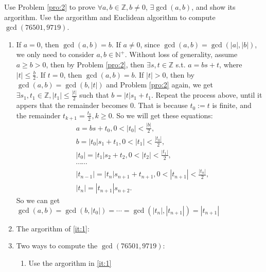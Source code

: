 \documentclass{ctexart}
\begin{document}
\begin{problem}
  Use Problem \ref{pro:2} to prove \(\forall a,b \in \mathbb{Z}, b \neq 0\), \(\exists \gcd(a,b)\), and show its argorithm.
  Use the argorithm and Euclidean algorithm to compute \(\gcd(76501,9719)\).
\end{problem}
\begin{solution}
  \begin{enumerate}
    \item \label{it:1} If \(a =0\), then \(\gcd(a,b) = b\).
      If \(a \neq 0\), since \(\gcd(a,b) = \gcd(|a|,|b|)\), we only need to consider \(a,b \in \mathbb{N}^+\).
      Without loss of generality, assume \(a \geq b > 0\), then by
      Problem \ref{pro:2}, then \(\exists s, t \in \mathbb{Z}\) s.t. \(a = bs + t\), where \(|t| \leq \frac{b}{2}\).
      If \(t=0\), then \(\gcd(a,b) =b\). If \(|t| >0\), then by \(\gcd(a,b) = \gcd(b,|t|)\) and Problem \ref{pro:2} again, we get \(\exists s_1,t_1 \in \mathbb{Z}, |t_1| \leq \frac{|t|}{2}\) such that
      \(b = |t|s_1 + t_1\). Repeat the process above, until it appers that the remainder becomes \(0\).
      That is because \(t_0:=t\) is finite, and the remainder \( t_{k + 1} = \frac{t_k}{2}, k \geq 0\).
      So we will get these equations:
      \begin{equation}
        \begin{aligned}
           & a = bs + t_0, 0 < |t_0| < \frac{|b|}{2},                           \\
           & b = |t_0|s_1 + t_1, 0 < |t_1| < \frac{|t_0|}{2},                   \\
           & |t_0| = |t_1|s_2 + t_2, 0 < |t_2| < \frac{|t_1|}{2},               \\
           & \cdots\cdots                                                       \\
           & |t_{n-1}| = |t_{n}|s_{n+1}+t_{n+1}, 0< |t_{n+1}| <\frac{|t_n|}{2}, \\
           & |t_{n}| = |t_{n+1}|s_{n+2}.
        \end{aligned}
      \end{equation}
      So we can get \(\gcd(a,b)=\gcd(b,|t_0|)=\cdots=\gcd(|t_n|,|t_{n+1}|)=|t_{n+1}|\)
    \item The argorithm of \ref{it:1}:
      
    \item Two ways to compute the \(\gcd(76501,9719)\):\\
      \begin{enumerate}
        \item Use the argorithm in \ref{it:1}

\end{enumerate}
\end{enumerate}
\end{solution}
\end{document}
